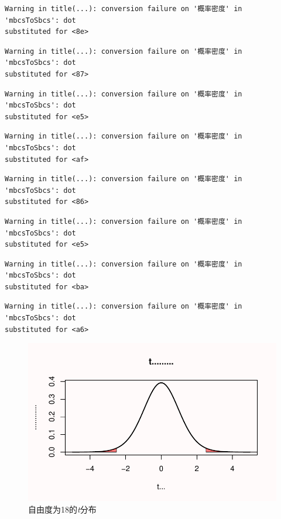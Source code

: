 \documentclass[
  letterpaper,
  DIV=11,
  numbers=noendperiod]{scrreprt}
\begin{document}
\begin{verbatim}
Warning in title(...): conversion failure on '概率密度' in 'mbcsToSbcs': dot
substituted for <8e>
\end{verbatim}

\begin{verbatim}
Warning in title(...): conversion failure on '概率密度' in 'mbcsToSbcs': dot
substituted for <87>
\end{verbatim}

\begin{verbatim}
Warning in title(...): conversion failure on '概率密度' in 'mbcsToSbcs': dot
substituted for <e5>
\end{verbatim}

\begin{verbatim}
Warning in title(...): conversion failure on '概率密度' in 'mbcsToSbcs': dot
substituted for <af>
\end{verbatim}

\begin{verbatim}
Warning in title(...): conversion failure on '概率密度' in 'mbcsToSbcs': dot
substituted for <86>
\end{verbatim}

\begin{verbatim}
Warning in title(...): conversion failure on '概率密度' in 'mbcsToSbcs': dot
substituted for <e5>
\end{verbatim}

\begin{verbatim}
Warning in title(...): conversion failure on '概率密度' in 'mbcsToSbcs': dot
substituted for <ba>
\end{verbatim}

\begin{verbatim}
Warning in title(...): conversion failure on '概率密度' in 'mbcsToSbcs': dot
substituted for <a6>
\end{verbatim}

\begin{figure}

{\centering \includegraphics[width=1\textwidth,height=\textheight]{01-pvalue_files/figure-pdf/fig-tdist-1.pdf}

}

\caption{\label{fig-tdist}自由度为18的\emph{t}分布}

\end{figure}
\end{document}
